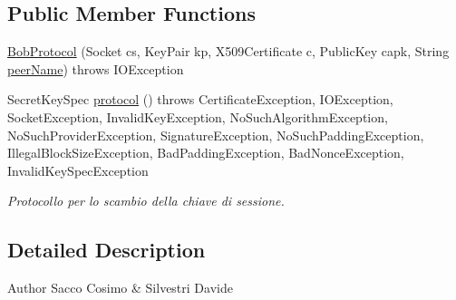 \subsection*{\-Public \-Member \-Functions}
\begin{DoxyCompactItemize}
\item 
\hyperlink{classit_1_1saccosilvestri_1_1jsp2p_1_1protocol_1_1_bob_protocol_af19d99e7959d7a16d0a452a0f7bc692c}{\-Bob\-Protocol} (\-Socket cs, \-Key\-Pair kp, \-X509\-Certificate c, \-Public\-Key capk, \-String \hyperlink{classit_1_1saccosilvestri_1_1jsp2p_1_1protocol_1_1_protocol_a6dcf1366f63023a80091ab663ecd3060}{peer\-Name})  throws I\-O\-Exception 
\item 
\-Secret\-Key\-Spec \hyperlink{classit_1_1saccosilvestri_1_1jsp2p_1_1protocol_1_1_bob_protocol_af5e630fb51c6acf73adc5cd5a76017a2}{protocol} ()  throws Certificate\-Exception, I\-O\-Exception, 			\-Socket\-Exception, Invalid\-Key\-Exception, No\-Such\-Algorithm\-Exception, 			\-No\-Such\-Provider\-Exception, Signature\-Exception, 			\-No\-Such\-Padding\-Exception, Illegal\-Block\-Size\-Exception, 			\-Bad\-Padding\-Exception, Bad\-Nonce\-Exception, Invalid\-Key\-Spec\-Exception 
\begin{DoxyCompactList}\small\item\em \-Protocollo per lo scambio della chiave di sessione. \end{DoxyCompactList}\end{DoxyCompactItemize}


\subsection{\-Detailed \-Description}
\begin{DoxyAuthor}{\-Author}
\-Sacco \-Cosimo \& \-Silvestri \-Davide 
\end{DoxyAuthor}


